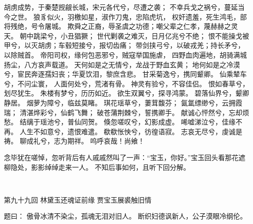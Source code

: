 \documentclass[12pt,oneside]{book}
\begin{document}
胡虏成势，于秦楚觊觎长城，宋元各代兮，尽遭之袭；
不幸兵戈之祸兮，蔓延当今之世。
狼豸似火，羽檄如星，淑作刀鬼，忠陷虎坑，
权奸遗羞，死生鸿毛，部将残绝，号令屠城。
欺舜之正裔，辱圣虞之功德；嘲父辈之仁孝，蔑赫赫之灵天。
朝中跳梁兮，小丑猖獗；
世代剿袭之难灭，日月亿兆兮不绝；
恨不能操戈被甲兮，以灭胡虏；车毂短接兮，报切齿痛；
带剑挟弓兮，以破戎羌；持长矛兮，以除贼首。
帝阳司权，缘何包恶邪兮，贼寇举国施虐，
四野血肉遍地，胡骑满城扬尘，八方哀声载道。
天何如是之无情兮，龙战于野血玄黄；
地何如是之冷漠兮，宦民奔逐孺妇丧；华夏饮泪，黎庶含悲。
甘采菊逸兮，携同颦卿。
仙乘辇车兮，不问尘寰，
人面何处兮，荒渚有骨。
神灵有验兮，不容佳侣。
恨如春草兮，划尽犹生。
朱楼有梦兮，历历如近。
欲生双翼兮，探寻鸿蒙。
碧落仙界兮，颦卿静居。
烟萝为障兮，临兹莫睹。
琪花瑶草兮，萋茸馥芬；
氤氲缥缈兮，云拥霞瑞；
清湛烨彩兮，仙鹤飞舞；
破苍蒲荆棘兮，誓携卿手。
献诚心怦然兮，忘却烦愁。
结缡于瑶池兮，普仙同贺。
倏忽嗟叹兮，幻影成虚。
唏嘘涕泣兮，佳缘不再。
人生不如意兮，遗恨难遣。
欷欷怅怏兮，彷徨语寂。
志哀无尽兮，虔诚是祷。
聊成礼兮，志为期祥。
呜呼哀哉！尚飨！

念毕犹在嗟悼，忽听背后有人戚戚然叫了一声：“宝玉，你好。”宝玉回头看那花遮柳隐处，影影绰绰走来一人。
不知后事如何，且听下回分解。

 
 
第九十九回 林黛玉还魂证前缘 贾宝玉展裘触旧情

题曰：
傲骨冰清不染尘，孤魂无泪对旧人。
断织妇德讽新人，公子漠眼冷纲伦。
\end{document}
